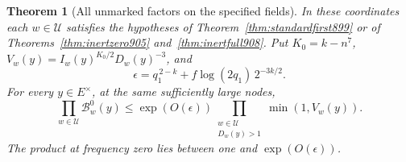 \documentclass[a4paper,11pt]{article}
\newtheorem{theorem}[proposition]{Theorem}
\theoremstyle{definition}
\theoremstyle{remark}
\numberwithin{equation}{section}
\begin{document}
\begin{theorem}[All unmarked factors on the specified fields]
\leavevmode\label{thm:allunmarked909}
In these coordinates each \(w\in\mathcal U\) satisfies the
hypotheses of Theorem~\ref{thm:standardfirst899} or of
Theorems~\ref{thm:inertzero905} and~\ref{thm:inertfull908}.
Put \(K_0=k-n^7\), \(V_w(y)=I_w(y)^{K_0/2}D_w(y)^{-3}\),
and
\[
             \epsilon=q_1^{\,2-k}
                         +f\log(2q_1)\,2^{-3k/2}.
\]
For every \(y\in E^\times\), at the same sufficiently large nodes,
\begin{equation}
     \prod_{w\in\mathcal U}\mathcal B^0_w(y)
       \le \exp(O(\epsilon))
            \prod_{\substack{w\in\mathcal U\\D_w(y)>1}}
                                  \min(1,V_w(y)).
 \label{eq:allunmarked909}
\end{equation}
The product at frequency zero lies between one and
\(\exp(O(\epsilon))\).
\end{theorem}
\end{document}
